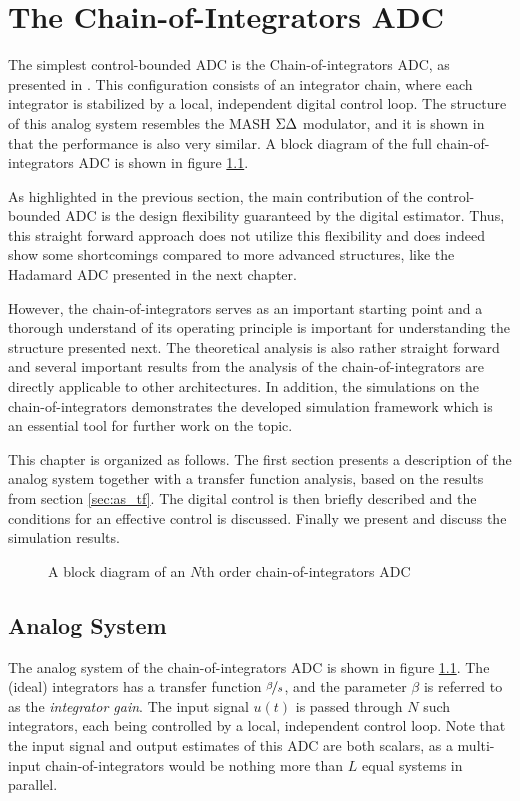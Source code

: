 
\chapter{The Chain-of-Integrators ADC}
\label{sec:ciadc}
The simplest control-bounded ADC is the Chain-of-integrators ADC, as presented in \cite{cbc_2020_loeliger}. This configuration consists of an integrator chain, where each integrator is stabilized by a local, independent digital control loop. The structure of this analog system resembles the MASH $\Sigma\Delta$ modulator, and it is shown in \cite{malmberg_thesis} that the performance is also very similar. A block diagram of the full chain-of-integrators ADC is shown in figure \ref{fig:CI}.

As highlighted in the previous section, the main contribution of the control-bounded ADC is the design flexibility guaranteed by the digital estimator. Thus, this straight forward approach does not utilize this flexibility and does indeed show some shortcomings compared to more advanced structures, like the Hadamard ADC presented in the next chapter.

However, the chain-of-integrators serves as an important starting point and a thorough understand of its operating principle is important for understanding the structure presented next. The theoretical analysis is also rather straight forward and several important results from the analysis of the chain-of-integrators are directly applicable to other architectures. In addition, the simulations on the chain-of-integrators demonstrates the developed simulation framework which is an essential tool for further work on the topic.

This chapter is organized as follows. The first section presents a description of the analog system together with a transfer function analysis, based on the results from section \ref{sec:as_tf}. The digital control is then briefly described and the conditions for an effective control is discussed. Finally we present and discuss the simulation results.


\begin{figure}[hbp]
    \centering
    
    \caption{A block diagram of an $N$th order chain-of-integrators ADC}
    \label{fig:CI}
\end{figure}





\section{Analog System}
The analog system of the chain-of-integrators ADC is shown in figure \ref{fig:CI}. The (ideal) integrators has a transfer function $\nicefrac{\beta}{s}$, and the parameter $\beta$ is referred to as the \textit{integrator gain}. The input signal $u(t)$ is passed through $N$ such integrators, each being controlled by a local, independent control loop. Note that the input signal and output estimates of this ADC are both scalars, as a multi-input chain-of-integrators would be nothing more than $L$ equal systems in parallel.


